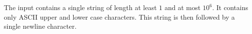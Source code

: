 

The input contains a single string of length at least $1$
and at most $10^6$. It contains only ASCII upper and lower
case characters. This string is then followed by a single
newline character.

